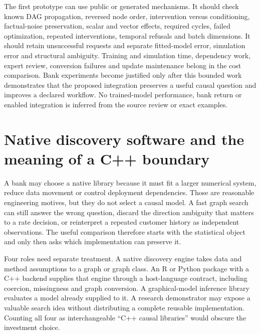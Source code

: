 The first prototype can use public or generated mechanisms. It should check
known DAG propagation, reversed node order, intervention versus conditioning,
factual-noise preservation, scalar and vector effects, required cycles, failed
optimization, repeated interventions, temporal refusals and batch dimensions.
It should retain unsuccessful requests and separate fitted-model error,
simulation error and structural ambiguity. Training and simulation time,
dependency work, expert review, conversion failures and update maintenance
belong in the cost comparison. Bank experiments become justified only after
this bounded work demonstrates that the proposed integration preserves a
useful causal question and improves a declared workflow. No trained-model
performance, bank return or enabled integration is inferred from the source
review or exact examples. \citep{exec14_causica_decision}

\label{exec14:causica-contract-end}


\section{Native discovery software and the meaning of a C++ boundary}
\label{exec13:cxx-discovery}

A bank may choose a native library because it must fit a larger numerical
system, reduce data movement or control deployment dependencies. Those are
reasonable engineering motives, but they do not select a causal model. A
fast graph search can still answer the wrong question, discard the direction
ambiguity that matters to a rate decision, or reinterpret a repeated customer
history as independent observations. The useful comparison therefore starts
with the statistical object and only then asks which implementation can
preserve it.

Four roles need separate treatment. A native discovery engine takes data and
method assumptions to a graph or graph class. An R or Python package with a
C++ backend supplies that engine through a host-language contract, including
coercion, missingness and graph conversion. A graphical-model inference
library evaluates a model already supplied to it. A research demonstrator
may expose a valuable search idea without distributing a complete reusable
implementation. Counting all four as interchangeable ``C++ causal
libraries'' would obscure the investment choice.

